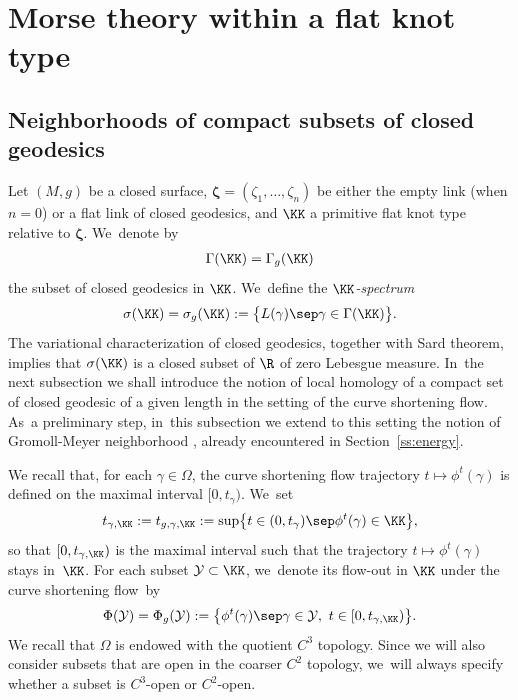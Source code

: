 \section{Morse theory within a flat knot type}\label{s:Morse}

\subsection{Neighborhoods of compact subsets of closed geodesics}\label{ss:nbhds}

Let $(M,g)$ be a closed surface, $\bm\zeta=(\zeta_1,\dots,\zeta_n)$ be either the empty link (when $n=0$) or a flat link of closed geodesics, and $\KK$ a primitive flat knot type relative to $\bm\zeta$. We~denote by
\begin{align*}
\Gamma(\KK)=\Gamma_g(\KK)
\end{align*}
the subset of closed geodesics in $\KK$. We~define the \emph{$\KK$-spectrum}
\begin{align*}
\sigma(\KK) = \sigma_g(\KK) := \big\{ L(\gamma)\sep \gamma\in\Gamma(\KK) \big\}.
\end{align*}
The variational characterization of closed geodesics, together with Sard theorem, implies that $\sigma(\KK)$ is a closed subset of $\R$ of zero Lebesgue measure. In~the next subsection we shall introduce the notion of local homology of a compact set of closed geodesic of a given length in the setting of the curve shortening flow. As~a preliminary step, in~this subsection we extend to this setting the notion of Gromoll-Meyer neighborhood \cite{Gromoll:1969aa,Gromoll:1969ab}, already encountered in Section~\ref{ss:energy}.

We recall that, for each $\gamma\in\Omega$, the curve shortening flow trajectory $t\mapsto\phi^t(\gamma)$ is defined on the maximal interval $[0,t_\gamma)$. We~set
\begin{align}
\label{e:exit_time_K}
t_{\gamma,\KK}:=t_{g,\gamma,\KK}:=\sup\bigl\{ t\in(0,t_{\gamma})\sep \phi^t(\gamma)\in\KK \bigr\},
\end{align}
so that $[0,t_{\gamma,\KK})$ is the maximal interval such that the trajectory $t\mapsto\phi^t(\gamma)$ stays in~$\KK$.
For each subset $\mathcal Y\subset\KK$, we~denote its flow-out in $\KK$ under the curve shortening flow~by
\begin{align*}
\Phi(\mathcal Y)
=
\Phi_g(\mathcal Y)
:=
\bigl\{ \phi^t(\gamma)\sep \gamma\in \mathcal Y,\ t\in[0,t_{\gamma,\KK}) \bigr\}.
\end{align*}
We recall that $\Omega$ is endowed with the quotient $C^3$ topology. Since we will also consider subsets that are open in the coarser $C^2$ topology, we~will always specify whether a subset is $C^3$-open or $C^2$-open.

